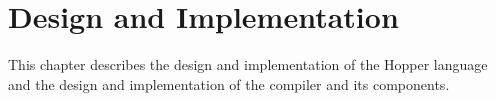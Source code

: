 \chapter{Design and Implementation}


This chapter describes the design and implementation of the Hopper language and the design
and implementation of the compiler and its components.








